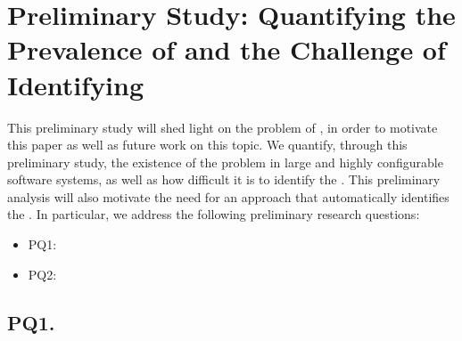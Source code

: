 
\section{Preliminary Study: Quantifying the Prevalence of \inconsistent and the Challenge of Identifying \inconsistent } \label{sec:pq-results}

This preliminary study will shed light on the problem of \inconsistent, in order to motivate this paper as well as future work on this topic. We quantify, through this preliminary study, the existence of the \inconsistent problem in large and highly configurable software systems, as well as how difficult it is to identify the \inconsistent. 
This preliminary analysis will also motivate the need for an approach that automatically identifies the \inconsistent. 
In particular, we address the following preliminary research questions: 

\begin{itemize}
    \item[] PQ1: \PQI
    \item[] PQ2: \PQII
\end{itemize}

\subsection*{\textbf{PQ1. \PQI}}
\label{sec:rq1}
